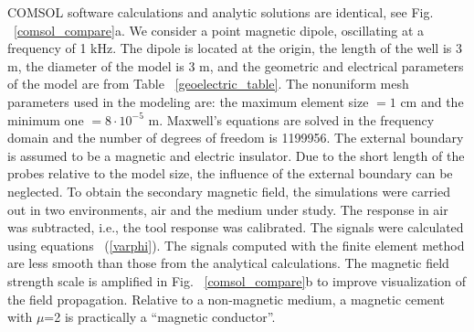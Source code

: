 \documentclass[10pt,twoside]{article}
\begin{document}
COMSOL software calculations and analytic solutions are identical, see Fig. ~\ref{comsol_compare}a. We consider a point magnetic dipole, oscillating at a frequency of 1 kHz. The dipole is located at the origin, the length of the well is 3 m, the diameter of the model is 3 m, and the geometric and electrical parameters of the model are from Table ~\ref{geoelectric_table}.  {The nonuniform mesh parameters used in the modeling are: the maximum element size $=1$ cm and the minimum one $=8\cdot10^{-5}$ m. Maxwell's equations are solved in the frequency domain and the number of degrees of freedom is 1199956. The external boundary is assumed to be a magnetic and electric insulator. Due to the short length of the probes relative to the model size, the influence of the external boundary can be neglected.} To obtain the secondary magnetic field, the simulations were carried out in two environments, air and the medium under study. The response in air was subtracted, i.e., the tool response was calibrated.
The signals were calculated using equations ~(\ref{varphi}). The signals computed with the finite element method are less smooth than those from the analytical calculations. The magnetic field strength scale is amplified in Fig. ~\ref{comsol_compare}b to improve visualization of the field propagation. Relative to a non-magnetic medium, a magnetic cement with $\mu$=2 is practically a ``magnetic conductor''.
\end{document}
